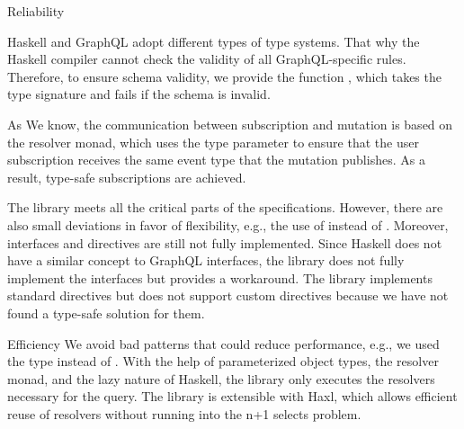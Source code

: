 \begin{frame}[allowframebreaks]
\begin{block}{Reliability}
\begin{itemize}
\begin{enumerate}
       Haskell and GraphQL adopt different types of type systems. That why the Haskell compiler cannot check the validity of all GraphQL-specific rules. Therefore, to ensure schema validity, we provide the function , which takes the  type signature and fails if the schema is invalid.
    
       As We know, the communication between subscription and mutation is based on the resolver monad, which uses the type parameter  to ensure that the user subscription receives the same event type that the mutation publishes.   As a result, type-safe subscriptions are achieved.

    \end{enumerate}

   The library meets all the critical parts of the specifications. However, there are also small deviations in favor of flexibility, e.g., the use of  instead of . Moreover, interfaces and directives are still not fully implemented. Since Haskell does not have a similar concept to GraphQL interfaces, the library does not fully implement the interfaces but provides a workaround. The library implements standard directives but does not support custom directives because we have not found a type-safe solution for them.

\end{itemize}

\end{block}

\begin{block}{Efficiency} We avoid bad patterns that could reduce performance, e.g., we used the type  instead of . 
With the help of parameterized object types, the resolver monad, and the lazy nature of Haskell, the library only executes the resolvers necessary for the query. The library is extensible with Haxl, which allows efficient reuse of resolvers without running into the n+1 selects problem.

\end{block}

\end{frame}

